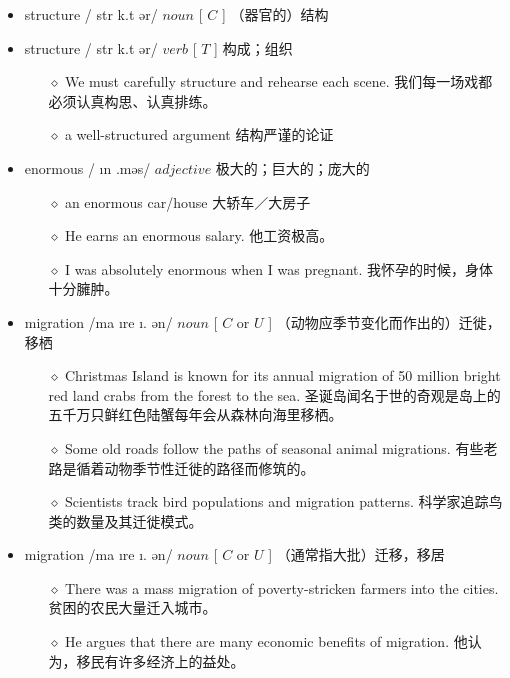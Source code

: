 \documentclass[a4paper,top=2.5cm,buttom=2.5cm10.5pt]{book}
\begin{document}
\begin{itemize}
\item structure / \textprimstress str \textturnv k.t \textesh ər/ $ noun $ [  $ C $  ] （器官的）结构
\end{itemize}
\begin{itemize}
\item structure / \textprimstress str \textturnv k.t \textesh ər/ $ verb $ [  $ T $  ] 构成；组织
\begin{itemize}
\item[$\diamond$] We must carefully structure and rehearse each scene.
我们每一场戏都必须认真构思、认真排练。
\item[$\diamond$] a well-structured argument
结构严谨的论证
\end{itemize}
\end{itemize}
\begin{itemize}
\item enormous / \i  \textprimstress n \textopeno  \textlengthmark .məs/ $ adjective $  极大的；巨大的；庞大的
\begin{itemize}
\item[$\diamond$] an enormous car/house
大轿车／大房子
\item[$\diamond$] He earns an enormous salary.
他工资极高。
\item[$\diamond$] I was absolutely enormous when I was pregnant.
我怀孕的时候，身体十分臃肿。
\end{itemize}
\end{itemize}
\begin{itemize}
\item migration /ma \i  \textprimstress  \textscriptg re \i . \textesh ən/ $ noun $ [  $ C $  or  $ U $  ] （动物应季节变化而作出的）迁徙，移栖
\begin{itemize}
\item[$\diamond$] Christmas Island is known for its annual migration of 50 million bright red land crabs from the forest to the sea.
圣诞岛闻名于世的奇观是岛上的五千万只鲜红色陆蟹每年会从森林向海里移栖。
\item[$\diamond$] Some old roads follow the paths of seasonal animal migrations.
有些老路是循着动物季节性迁徙的路径而修筑的。
\item[$\diamond$] Scientists track bird populations and migration patterns.
科学家追踪鸟类的数量及其迁徙模式。
\end{itemize}
\end{itemize}
\begin{itemize}
\item migration /ma \i  \textprimstress  \textscriptg re \i . \textesh ən/ $ noun $ [  $ C $  or  $ U $  ] （通常指大批）迁移，移居
\begin{itemize}
\item[$\diamond$] There was a mass migration of poverty-stricken farmers into the cities.
贫困的农民大量迁入城市。
\item[$\diamond$] He argues that there are many economic benefits of migration.
他认为，移民有许多经济上的益处。
\end{itemize}
\end{itemize}
\end{document}
